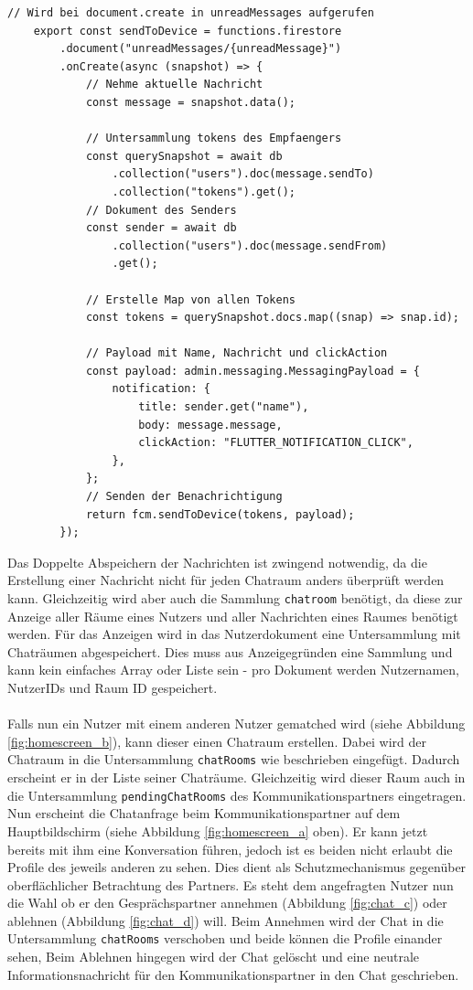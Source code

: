 \begin{lstlisting}[caption=Cloud Functions zur Erstellung von Benachrichtigungen, label=lst:chat_functions]
	// Wird bei document.create in unreadMessages aufgerufen
	export const sendToDevice = functions.firestore
		.document("unreadMessages/{unreadMessage}")
		.onCreate(async (snapshot) => {
			// Nehme aktuelle Nachricht
			const message = snapshot.data();
		
			// Untersammlung tokens des Empfaengers
			const querySnapshot = await db
				.collection("users").doc(message.sendTo)
				.collection("tokens").get();
			// Dokument des Senders
			const sender = await db
				.collection("users").doc(message.sendFrom)
				.get();
			
			// Erstelle Map von allen Tokens
			const tokens = querySnapshot.docs.map((snap) => snap.id);
			
			// Payload mit Name, Nachricht und clickAction
			const payload: admin.messaging.MessagingPayload = {
				notification: {
					title: sender.get("name"),
					body: message.message,
					clickAction: "FLUTTER_NOTIFICATION_CLICK",
				},
			};
			// Senden der Benachrichtigung
			return fcm.sendToDevice(tokens, payload);
		});
\end{lstlisting}

\noindent
Das Doppelte Abspeichern der Nachrichten ist zwingend notwendig, da die Erstellung einer Nachricht nicht für jeden Chatraum anders überprüft werden kann.
Gleichzeitig wird aber auch die Sammlung \texttt{chatroom} benötigt, da diese zur Anzeige aller Räume eines Nutzers und aller Nachrichten eines Raumes benötigt werden.
Für das Anzeigen wird in das Nutzerdokument eine Untersammlung mit Chaträumen abgespeichert.
Dies muss aus Anzeigegründen eine Sammlung und kann kein einfaches Array oder Liste sein - pro Dokument werden Nutzernamen, NutzerIDs und Raum ID gespeichert.\\
\\
Falls nun ein Nutzer mit einem anderen Nutzer gematched wird (siehe Abbildung \ref{fig:homescreen_b}), kann dieser einen Chatraum erstellen.
Dabei wird der Chatraum in die Untersammlung \texttt{chatRooms} wie beschrieben eingefügt.
Dadurch erscheint er in der Liste seiner Chaträume.
Gleichzeitig wird dieser Raum auch in die Untersammlung \texttt{pendingChatRooms} des Kommunikationspartners eingetragen.
Nun erscheint die Chatanfrage beim Kommunikationspartner auf dem Hauptbildschirm (siehe Abbildung \ref{fig:homescreen_a} oben).
Er kann jetzt bereits mit ihm eine Konversation führen, jedoch ist es beiden nicht erlaubt die Profile des jeweils anderen zu sehen.
Dies dient als Schutzmechanismus gegenüber oberflächlicher Betrachtung des Partners.
Es steht dem angefragten Nutzer nun die Wahl ob er den Gesprächspartner annehmen (Abbildung \ref{fig:chat_c}) oder ablehnen (Abbildung \ref{fig:chat_d}) will.
Beim Annehmen wird der Chat in die Untersammlung \texttt{chatRooms} verschoben und beide können die Profile einander sehen,
Beim Ablehnen hingegen wird der Chat gelöscht und eine neutrale Informationsnachricht für den Kommunikationspartner in den Chat geschrieben.
